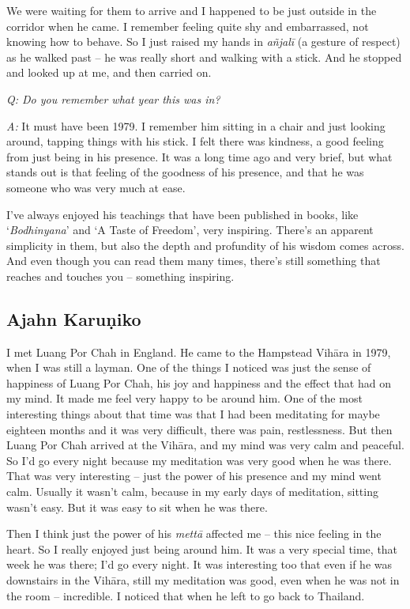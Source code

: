 We were waiting for them to arrive and I happened to be just outside in
the corridor when he came. I remember feeling quite shy and embarrassed,
not knowing how to behave. So I just raised my hands in \emph{añjalī} (a
gesture of respect) as he walked past -- he was really short and walking
with a stick. And he stopped and looked up at me, and then carried on.

\emph{Q: Do you remember what year this was in?}

\emph{A:} It must have been 1979. I remember him sitting in a chair and
just looking around, tapping things with his stick. I felt there was
kindness, a good feeling from just being in his presence. It was a long
time ago and very brief, but what stands out is that feeling of the
goodness of his presence, and that he was someone who was very much at
ease.

I've always enjoyed his teachings that have been published in books, 
like `\emph{Bodhinyana}' and `A Taste of Freedom', very inspiring.
There's an apparent simplicity in them, but also the depth and
profundity of his wisdom comes across. And even though you can read them
many times, there's still something that reaches and touches you --
something inspiring. 

\subsection{Ajahn Karuṇiko}

I met Luang Por Chah in England. He came to the Hampstead Vihāra in
1979, when I was still a layman. One of the things I noticed was just
the sense of happiness of Luang Por Chah, his joy and happiness and the
effect that had on my mind. It made me feel very happy to be around him. 
One of the most interesting things about that time was that I had been
meditating for maybe eighteen months and it was very difficult, there
was pain, restlessness. But then Luang Por Chah arrived at the Vihāra, 
and my mind was very calm and peaceful. So I'd go every night because my
meditation was very good when he was there. That was very interesting --
just the power of his presence and my mind went calm. Usually it wasn't
calm, because in my early days of meditation, sitting wasn't easy. But
it was easy to sit when he was there.

Then I think just the power of his \emph{mettā} affected me -- this nice
feeling in the heart. So I really enjoyed just being around him. It was
a very special time, that week he was there; I'd go every night. It was
interesting too that even if he was downstairs in the Vihāra, still my
meditation was good, even when he was not in the room -- incredible. I
noticed that when he left to go back to Thailand. 

